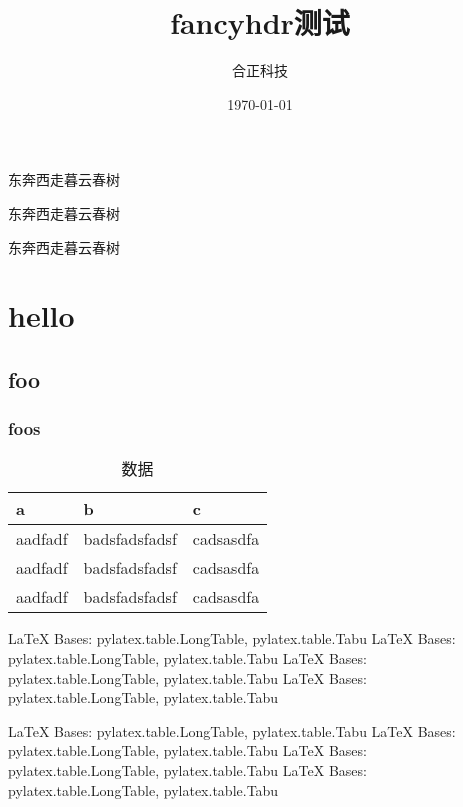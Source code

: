\documentclass{report}
\title{fancyhdr测试}
\author{合正科技}
\date{\today}
\begin{document}
\maketitle

\begin{centering}

{\heiti 东奔西走暮云春树}


{\fangsong 东奔西走暮云春树}



{\kaishu 东奔西走暮云春树}

\end{centering}


\chapter{hello}
\section{foo}
\subsection{foos}

\begin{table}[h!]
   \caption{数据}
   \label{tbl:data}
   \centering
   \begin{tabu} to 0.5\textwidth {X[l]X[2,c]X[r]}
   \toprule
   a & b & c\\
   \midrule
   aadfadf & badsfadsfadsf & cadsasdfa\\
   aadfadf & badsfadsfadsf & cadsasdfa\\
   aadfadf & badsfadsfadsf & cadsasdfa\\
   \bottomrule
   \end{tabu}
\end{table}

\LaTeX{} Bases: pylatex.table.LongTable, pylatex.table.Tabu
\LaTeX{} Bases: pylatex.table.LongTable, pylatex.table.Tabu
\LaTeX{} Bases: pylatex.table.LongTable, pylatex.table.Tabu
\LaTeX{} Bases: pylatex.table.LongTable, pylatex.table.Tabu
\newpage

\LaTeX{} Bases: pylatex.table.LongTable, pylatex.table.Tabu
\LaTeX{} Bases: pylatex.table.LongTable, pylatex.table.Tabu
\LaTeX{} Bases: pylatex.table.LongTable, pylatex.table.Tabu
\LaTeX{} Bases: pylatex.table.LongTable, pylatex.table.Tabu
\end{document}
